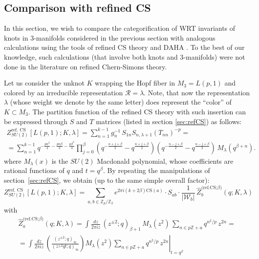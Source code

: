 \documentclass[hyper,letterpaper]{JHEP3}
\newcommand{\Z}{{\mathbb Z}}
\renewcommand{\hat}{\widehat}
\def\CR{{\mathcal R}}
\def\CW{{\mathcal W}}
\begin{document}
\subsection{Comparison with refined CS}
\label{sec:refCS-knots}

In this section, we wish to compare the categorification of WRT invariants of knots in 3-manifolds considered
in the previous section with analogous calculations using the tools of refined CS theory and DAHA \cite{Aganagic:2011sg,Cherednik:2011nr}.
To the best of our knowledge, such calculations (that involve both knots and 3-manifolds) were not done in the literature
on refined Chern-Simons theory.

Let us consider the unknot $K$ wrapping the Hopf fiber in $M_3 = L(p,1)$ and colored by an irreducible representation $\CR = \lambda$.
Note, that now the representation $\lambda$ (whose weight we denote by the same letter) does represent the ``color'' of $K \subset M_3$.
The partition function of the refined CS theory with such insertion
can be expressed through $S$ and $T$ matrices (listed in section \ref{sec:refCS}) as follows:
\begin{multline}
	Z_{SU(2)}^\text{ref.~CS}[L(p,1);K,\lambda]=\sum_{n=1}^{k-1} g^{-1}_n\,S_{1n}S_{n,\lambda+1}(T_{nn})^{-p}=\\
	=
	\sum_{n=1}^{k-1}q^{-\frac{pn^2}{4}-\frac{pn\beta}{2}-\frac{p\beta^2}{4}}
	\prod_{j=0}^\beta (q^{-\frac{n+j+\beta}{2}}-q^{\frac{n+j+\beta}{2}})
	(q^{-\frac{n-j+\beta}{2}}-q^{\frac{n-j+\beta}{2}})\,M_{\lambda}(q^{\beta+n}).
\end{multline}
where $M_\lambda(x)$ is the $SU(2)$ Macdonald polynomial, whose coefficients are rational functions of $q$ and $t=q^\beta$.
By repeating the manipulations of section~\ref{sec:refCS}, we obtain (up to the same simple overall factor):
\begin{equation}
	Z_{SU(2)}^\text{ref. CS}[L(p,1);K,\lambda]
	=\sum_{a,b\in \Z_p /\Z_2} e^{2\pi i (k+2\beta)\text{CS}(a)}\cdot
	S_{ab}\cdot \frac{1}{|\CW_b|}\,\hat{Z}^\text{(ref.CS;$\beta$)}_b(q;K,\lambda)
\end{equation}
with
\begin{multline}
	\hat{Z}^\text{(ref.CS;$\beta$)}_a(q;K,\lambda)=\int\frac{dz}{2\pi iz}\,(z^{\pm2};q)_{\beta+1}\,M_\lambda(z^2)\,\sum_{n\in p\Z+a}q^{n^2/p}\,z^{2n}=\\
	=\left.\int\frac{dz}{2\pi iz}\,\left(\frac{(z^{\pm2};q)_\infty}{(z^{\pm2}qt;q)_\infty}\right)
	M_\lambda(z^2)
	\sum_{n\in p\Z+a}q^{n^2/p}\,z^{2n}\right|_{t=q^\beta}
	\label{Z-ref-loop}
\end{multline}
\end{document}

